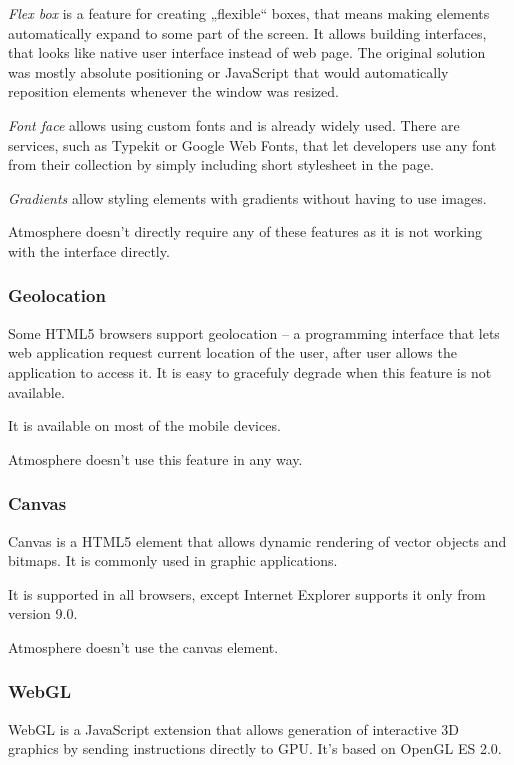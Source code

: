 \emph{Flex box} is a feature for creating „flexible“ boxes, that means making elements automatically expand to some part of the screen. It allows building interfaces, that looks like native user interface instead of web page. The original solution was mostly absolute positioning or JavaScript that would automatically reposition elements whenever the window was resized. 

\emph{Font face} allows using custom fonts and is already widely used. There are services, such as Typekit or Google Web Fonts, that let developers use any font from their collection by simply including short stylesheet in the page. 

\emph{Gradients} allow styling elements with gradients without having to use images.

Atmosphere doesn’t directly require any of these features as it is not working with the interface directly.  

\subsubsection{Geolocation}

Some HTML5 browsers support geolocation – a programming interface that lets web application request current location of the user, after user allows the application to access it. It is easy to gracefuly degrade when this feature is not available.

It is available on most of the mobile devices. 

Atmosphere doesn’t use this feature in any way.

\subsubsection{Canvas}

Canvas is a HTML5 element that allows dynamic rendering of vector objects and bitmaps. It is commonly used in graphic applications.

It is supported in all browsers, except Internet Explorer supports it only from version 9.0.

Atmosphere doesn’t use the canvas element.

\subsubsection{WebGL}

WebGL is a JavaScript extension that allows generation of interactive 3D graphics by sending instructions directly to GPU. It’s based on OpenGL ES 2.0. 

